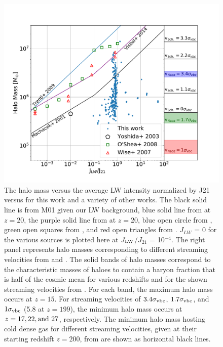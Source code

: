 \documentclass[fleqn,usenatbib]{mnras}
\begin{document}
\begin{figure}
	\includegraphics[width=\columnwidth]{images/compare_JLW_mass.pdf}
    \caption{The halo mass versus the average LW intensity normalized by J21 versus for this work and a variety of other works. The black solid line is from M01 given our LW background, blue solid line from \citet{Trenti09_SFR} at $z=20$, the purple solid line from \citet{Visbal14} at $z=20$, blue open circle from \citet{Yoshida03}, green open squares from \citet{OShea08}, and red open triangles from \citet{Wise07_UVB}. $J_{LW}$ = 0 for the various sources is plotted here at $J_{\rm LW}$/$J_{21}$ = 10$^{-4}$. The right panel represents halo masses corresponding to different streaming velocities from \citet{Naoz13} and \citet{Schauer19}. The solid bands of halo masses correspond to the characteristic masses of haloes to contain a baryon fraction that is half of the cosmic mean for various redshifts and for the shown streaming velocities from \citet{Naoz13}. For each band, the maximum halo mass occurs at $z = 15$. For streaming velocities of $3.4 \sigma_{\rm vbc}$, $1.7 \sigma_{\rm vbc}$, and $1 \sigma_{\rm vbc}$ (5.8 \kms{} at $z=199$), the minimum halo mass occurs at $z = 17, 22, \rm{and} \ 27$, respectively. The minimum halo mass hosting cold dense gas for different streaming velocities, given at their starting redshift $z=200$, from \citet{Schauer19} are shown as horizontal black lines.}
    \label{fig:compare_JLW_mass}
\end{figure}

\end{document}
